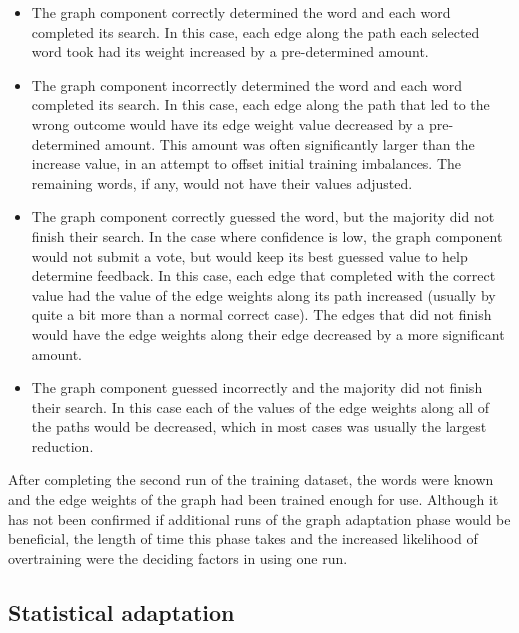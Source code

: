 \begin{itemize}      
	\item The graph component correctly determined the word and each word 
	completed its search.  In this case, each edge along the path each selected 
	word took had its weight increased by a pre-determined amount.
	\item The graph component incorrectly determined the word and each word 
	completed its search. In this case, each edge along the path that led to the 
	wrong outcome would have its edge weight value decreased by a 
	pre-determined  amount. This amount was often significantly larger than the 
	increase value, in an attempt to offset initial training imbalances. The 
	remaining words, if any, would not have their values adjusted.     
	\item The graph component correctly guessed the word, but the majority did 
	not finish their search. In the case where confidence is low, the graph 
	component would not submit a vote, but would keep its best guessed value to 
	help determine feedback. In this case, each edge that completed with the 
	correct value had the value of the edge weights along its path increased 
	(usually by quite a bit more than a normal correct case). The edges that did 
	not finish would have the edge weights along their edge decreased by a 
	more significant amount.     
	\item The graph component guessed incorrectly and the majority did not 
	finish their search. In this case each of the values of the edge weights 
	along all of the paths would be decreased, which 
	in most cases was usually the largest reduction. 
\end{itemize}

After completing the second run of the training dataset, the words were known and
the edge weights of the graph had been trained enough for use.  Although it has
not been confirmed if additional runs of the graph adaptation phase would be
beneficial, the length of time this phase takes and the increased likelihood
of overtraining were the deciding factors in using one run.

\subsection{Statistical adaptation}

